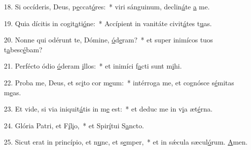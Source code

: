 18. Si occíderis, Deus, p\uline{e}ccat\uline{ó}res:~* viri sánguinum, declin\uline{á}te \uline{a} me.\par 
19. Quia dícitis in cogit\uline{a}ti\uline{ó}ne:~* Accípient in vanitáte civit\uline{á}tes t\uline{u}as.\par 
20. Nonne qui odérunt te, Dómine, \uline{ó}d\uline{e}ram?~* et super inimícos tuos t\uline{a}besc\uline{é}bam?\par 
21. Perfécto ódio \uline{ó}deram \uline{i}llos:~* et inimíci f\uline{a}cti sunt m\uline{i}hi.\par 
22. Proba me, Deus, et sc\uline{i}to cor m\uline{e}um:~* intérroga me, et cognósce s\uline{é}mitas m\uline{e}as.\par 
23. Et vide, si via iniquit\uline{á}tis in m\uline{e} est:~* et deduc me in v\uline{i}a æt\uline{é}rna.\par 
24. Glória Patri, et F\uline{í}l\uline{i}o,~* et Spir\uline{í}tui S\uline{a}ncto.\par 
25. Sicut erat in princípio, et n\uline{u}nc, et s\uline{e}mper,~* et in sǽcula sæcul\uline{ó}rum. \uline{A}men.\par 
